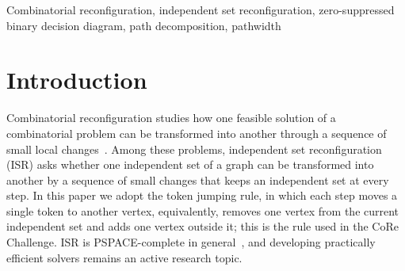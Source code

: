 \documentclass[conference]{IEEEtran}
\begin{document}
\begin{abstract}
Zero-suppressed binary decision diagrams (ZDDs) are a standard data structure for
compactly representing families of combinatorial solutions, and controlling the
pathwidth of the input graph is known to be effective for keeping ZDDs small when
they are constructed.
In combinatorial reconfiguration, however, a ZDD-based solver must repeatedly
perform transition computations on top of a solution-space ZDD, and it has
remained unclear how much pathwidth affects the performance of such solvers.
This paper investigates the impact of path decomposition as a preprocessing step
for ZDD-based solvers for the independent set reconfiguration (ISR) problem under
the token jumping rule.
We integrate path decomposition into \textsc{ddreconf}, a state-of-the-art
ZDD-based ISR solver, by reordering the input edges according to a computed
decomposition, and we analyze how this reduces ZDD size both at construction time
and during reconfiguration.
Computational experiments on the shortest and farthest variants show that the
proposed preprocessing consistently improves the performance of
\textsc{ddreconf}.
Moreover, even heuristic path decompositions that do not necessarily minimize
pathwidth are sufficient to obtain substantial speedups in practice.
\end{abstract}

\begin{IEEEkeywords}
Combinatorial reconfiguration, independent set reconfiguration, zero-suppressed binary decision diagram, path decomposition, pathwidth
\end{IEEEkeywords}

\section{Introduction}
Combinatorial reconfiguration studies how one feasible solution of a
combinatorial problem can be transformed into another through a sequence of small
local changes~\cite{nishimura18}.
Among these problems, independent set reconfiguration (ISR) asks whether one
independent set of a graph can be transformed into another by a sequence of small
changes that keeps an independent set at every step.
In this paper we adopt the token jumping rule, in which each step moves a single
token to another vertex, equivalently, removes one vertex from the current
independent set and adds one vertex outside it; this is the rule used in the CoRe
Challenge.
ISR is PSPACE-complete in general~\cite{kamemi12,itdehapasiueun11}, and developing
practically efficient solvers remains an active research topic.
\end{document}
